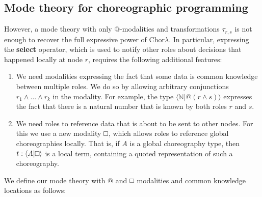 \documentclass{scrartcl}
\theoremstyle{definition}
\theoremstyle{plain}
\renewcommand{\square}%
  {\tikz{\draw (0,0) rectangle (0.2cm,0.2cm);}}
\begin{document}
\subsection{Mode theory for choreographic programming}
However, a mode theory with only $@$-modalities and transformations
$\tau_{r,s}$ is not enough to recover the full expressive power of
Chor$\lambda$. In particular, expressing the \textbf{select} operator, which is
used to notify other roles about decisions that happened locally at node $r$,
requires the following additional features:
\begin{enumerate}
\item
  We need modalities expressing the fact that some data is common knowledge
  between multiple roles. We do so by allowing arbitrary conjunctions $r_1
  \land \ldots \land r_k$ in the modality. For example, the type $\langle
  \mathbb{N} | @(r\land s) \rangle$ expresses the fact that there is a natural
  number that is known by both roles $r$ and $s$.
\item
  We need roles to reference data that is about to be sent to other nodes. For
  this we use a new modality $\square$, which allows roles to reference global
  choreographies locally. That is, if $A$ is a global choreography type, then
  $t : \langle A | \square \rangle$ is a local term, containing a quoted
  representation of such a choreography.
\end{enumerate}
We define our mode theory with $@$ and $\square$ modalities and common
knowledge locations as follows:
\end{document}

